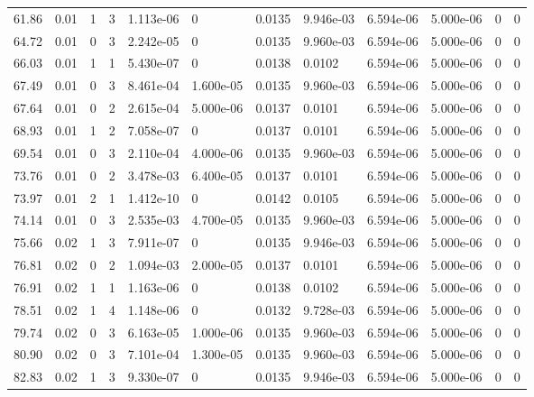 \documentclass[preview]{standalone}
\begin{document}
{{{\begin{tabular}{L{1.2cm}C{1.2cm} C{0.3cm}C{0.5cm} C{1.4cm}C{1.4cm} C{1.4cm}C{1.4cm} C{1.6cm}C{1.6cm} C{1.6cm}C{1.6cm}}
  61.86  &  0.01  & 1     &  3 &  1.113e-06  & 0  &  0.0135&   9.946e-03& 6.594e-06 & 5.000e-06   &  0 & 0  \\ 
  64.72  &  0.01  & 0     &  3 &  2.242e-05  & 0  &  0.0135&   9.960e-03& 6.594e-06 & 5.000e-06   &  0 & 0  \\ 
  66.03  &  0.01  & 1     &  1 &  5.430e-07  & 0  &  0.0138&   0.0102& 6.594e-06 & 5.000e-06   &  0 & 0  \\ 
  67.49  &  0.01  & 0     &  3 &  8.461e-04  & 1.600e-05  &  0.0135&   9.960e-03& 6.594e-06 & 5.000e-06   &  0 & 0  \\ 
  67.64  &  0.01  & 0     &  2 &  2.615e-04  & 5.000e-06  &  0.0137&   0.0101& 6.594e-06 & 5.000e-06   &  0 & 0  \\ 
  68.93  &  0.01  & 1     &  2 &  7.058e-07  & 0  &  0.0137&   0.0101& 6.594e-06 & 5.000e-06   &  0 & 0  \\ 
  69.54  &  0.01  & 0     &  3 &  2.110e-04  & 4.000e-06  &  0.0135&   9.960e-03& 6.594e-06 & 5.000e-06   &  0 & 0  \\ 
  73.76  &  0.01  & 0     &  2 &  3.478e-03  & 6.400e-05  &  0.0137&   0.0101& 6.594e-06 & 5.000e-06   &  0 & 0  \\ 
  73.97  &  0.01  & 2     &  1 &  1.412e-10  & 0  &  0.0142&   0.0105& 6.594e-06 & 5.000e-06   &  0 & 0  \\ 
  74.14  &  0.01  & 0     &  3 &  2.535e-03  & 4.700e-05  &  0.0135&   9.960e-03& 6.594e-06 & 5.000e-06   &  0 & 0  \\ 
  75.66  &  0.02  & 1     &  3 &  7.911e-07  & 0  &  0.0135&   9.946e-03& 6.594e-06 & 5.000e-06   &  0 & 0  \\ 
  76.81  &  0.02  & 0     &  2 &  1.094e-03  & 2.000e-05  &  0.0137&   0.0101& 6.594e-06 & 5.000e-06   &  0 & 0  \\ 
  76.91  &  0.02  & 1     &  1 &  1.163e-06  & 0  &  0.0138&   0.0102& 6.594e-06 & 5.000e-06   &  0 & 0  \\ 
  78.51  &  0.02  & 1     &  4 &  1.148e-06  & 0  &  0.0132&   9.728e-03& 6.594e-06 & 5.000e-06   &  0 & 0  \\ 
  79.74  &  0.02  & 0     &  3 &  6.163e-05  & 1.000e-06  &  0.0135&   9.960e-03& 6.594e-06 & 5.000e-06   &  0 & 0  \\ 
  80.90  &  0.02  & 0     &  3 &  7.101e-04  & 1.300e-05  &  0.0135&   9.960e-03& 6.594e-06 & 5.000e-06   &  0 & 0  \\ 
  82.83  &  0.02  & 1     &  3 &  9.330e-07  & 0  &  0.0135&   9.946e-03& 6.594e-06 & 5.000e-06   &  0 & 0  \\ 

\end{tabular}}}}
\end{document}
